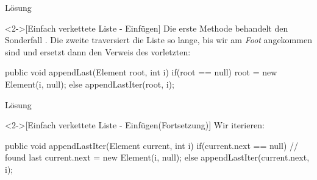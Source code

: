 \begin{frame}[fragile,c]{Lösung}
    \begin{solve}<2->[Einfach verkettete Liste - Einfügen]
        Die erste Methode behandelt den Sonderfall . Die zweite traversiert die Liste so lange,\pause{} bis wir am \emph{Foot} angekommen sind und ersetzt dann den Verweis des vorletzten:\pause{}
\begin{plainjava}
public void appendLast(Element root, int i) {
    if(root == null)
        root = new Element(i, null);
    else
        appendLastIter(root, i);
}
\end{plainjava}
    \end{solve}
\end{frame}

\begin{frame}[fragile,c]{Lösung}
    \addtocounter{solve}{-1}%
    \begin{solve}<2->[Einfach verkettete Liste - Einfügen\hfill{}(Fortsetzung)]
        Wir iterieren:
\begin{plainjava}
public void appendLastIter(Element current, int i){
    if(current.next == null) // found last
        current.next = new Element(i, null);
    else
        appendLastIter(current.next, i);
}
\end{plainjava}
    \end{solve}
\end{frame}
\fi

\def\Element#1{{\renewcommand{\arraystretch}{1.4}%
    \begin{tabular}{|p{1em}|>{\centering}p{1em}|p{1em}|}
        \hline
            & \strut#1 & \\
        \hline
    \end{tabular}%
}}

